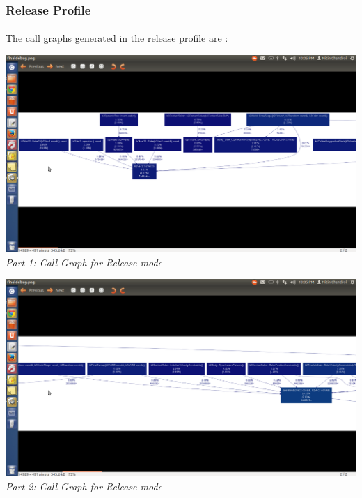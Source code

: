 \documentclass[11pt]{article}
\begin{document}
\subsubsection{Release Profile}
\paragraph{}
The call graphs generated in the release profile are :

\begin{center}
 \includegraphics[scale = 0.35]{images/f1} \\
  \emph{Part 1: Call Graph for Release mode} \\
\end{center}

\begin{center}
 \includegraphics[scale = 0.35]{images/f2} \\
  \emph{Part 2: Call Graph for Release mode} \\
\end{center}
\end{document}
